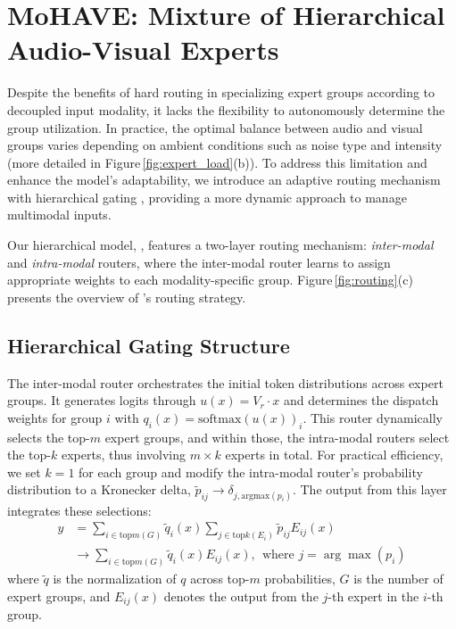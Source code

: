 \section{MoHAVE: Mixture of Hierarchical Audio-Visual Experts}
\label{sec:mohave}

Despite the benefits of hard routing in specializing expert groups according to decoupled input modality, it lacks the flexibility to autonomously determine the group utilization.
In practice, the optimal balance between audio and visual groups varies depending on ambient conditions such as noise type and intensity (more detailed in Figure\,\ref{fig:expert_load}(b)).
To address this limitation and enhance the model’s adaptability, we introduce an adaptive routing mechanism with hierarchical gating \cite{jordan1994hierarchical}, providing a more dynamic approach to manage multimodal inputs.

Our hierarchical model, \ourmodel, features a two-layer routing mechanism: \textit{inter-modal} and \textit{intra-modal} routers, where the inter-modal router learns to assign appropriate weights to each modality-specific group. Figure\,\ref{fig:routing}(c) presents the overview of \ourmodel's routing strategy.

\subsection{Hierarchical Gating Structure}
\label{subsec:hierarchical_gating}

The inter-modal router orchestrates the initial token distributions across expert groups. It generates logits through $u(x) = V_r \cdot x$ and determines the dispatch weights for group $i$ with $q_i(x) = \text{softmax}(u(x))_i$. This router dynamically selects the top-$m$ expert groups, and within those, the intra-modal routers select the top-$k$ experts, thus involving $m \times k$ experts in total. For practical efficiency, we set $k=1$ for each group and modify the intra-modal router's probability distribution to a Kronecker delta, $\tilde{p}_{ij} \rightarrow \delta_{j,\text{argmax}(p_i)}$.
The output from this layer integrates these selections:
\begin{align}
  y &= \!\!\!\!\sum_{i \in \text{top}m(G)} \!\!\tilde{q}_i(x)\!\! \sum_{j \in \text{top}k(E_i)} \!\!\tilde{p}_{ij} E_{ij}(x) \\
    &\rightarrow \!\!\!\!\sum_{i \in \text{top}m(G)} \!\!\tilde{q}_i(x)E_{ij}(x), ~~\text{where } j\!=\!\arg\max(p_i) 
\end{align}
where $\tilde{q}$ is the normalization of $q$ across top-$m$ probabilities, $G$ is the number of expert groups, and $E_{ij}(x)$ denotes the output from the $j$-th expert in the $i$-th group.

